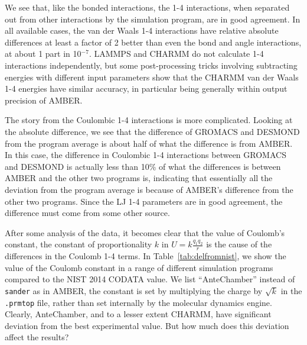 We see that, like the bonded interactions, the 1-4 interactions, when
separated out from other interactions by the simulation program, are
in good agreement.  In all available cases, the van der Waals 1-4
interactions have relative absolute differences at least a factor of 2
better than even the bond and angle interactions, at about 1 part in
10$^{-7}$. LAMMPS and CHARMM do not calculate 1-4 interactions
independently, but some post-processing tricks involving subtracting
energies with different input parameters show that the CHARMM van der
Waals 1-4 energies have similar accuracy, in particular being
generally within output precision of AMBER.

The story from the Coulombic 1-4 interactions is more
complicated. Looking at the absolute difference, we see that the
difference of GROMACS and DESMOND from the program average is about
half of what the difference is from AMBER. In this case, the
difference in Coulombic 1-4 interactions between GROMACS and DESMOND
is actually less than 10\% of what the differences is between AMBER
and the other two programs is, indicating that essentially all the
deviation from the program average is because of AMBER's difference
from the other two programs. Since the LJ 1-4 parameters are in good
agreement, the difference must come from some other source.

After some analysis of the data, it becomes clear that the value of
Coulomb's constant, the constant of proportionality $k$ in $U =
k\frac{q_1q_2}{r}$ is the cause of the differences in the Coulomb 1-4
terms. In Table~\ref{tab:delfromnist}, we show the value of the
Coulomb constant in a range of different simulation programs compared
to the NIST 2014 CODATA value.  We list ``AnteChamber'' instead of
{\tt sander} as in AMBER, the constant is set by multiplying the
charge by $\sqrt{k}$ in the {\tt .prmtop} file, rather than set
internally by the molecular dynamics engine.  Clearly, AnteChamber,
and to a lesser extent CHARMM, have significant deviation from the
best experimental value.  But how much does this deviation affect the
results?


